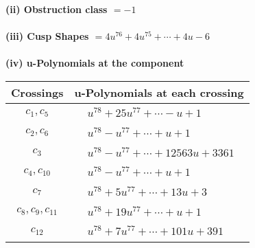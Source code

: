 \documentclass[1p]{elsarticle_modified}
\theoremstyle{definition}
\begin{document}
\flushleft \textbf{(ii) Obstruction class $= -1$}\\~\\
\flushleft \textbf{(iii) Cusp Shapes $= 4 u^{76}+4 u^{75}+\cdots+4 u-6$}\\~\\
\newpage\renewcommand{\arraystretch}{1}
\flushleft \textbf{(iv) u-Polynomials at the component}\newline \\
\begin{tabular}{m{50pt}|m{274pt}}
Crossings & \hspace{64pt}u-Polynomials at each crossing \\
\hline $$\begin{aligned}c_{1},c_{5}\end{aligned}$$&$\begin{aligned}
&u^{78}+25 u^{77}+\cdots- u+1
\end{aligned}$\\
\hline $$\begin{aligned}c_{2},c_{6}\end{aligned}$$&$\begin{aligned}
&u^{78}- u^{77}+\cdots+u+1
\end{aligned}$\\
\hline $$\begin{aligned}c_{3}\end{aligned}$$&$\begin{aligned}
&u^{78}- u^{77}+\cdots+12563 u+3361
\end{aligned}$\\
\hline $$\begin{aligned}c_{4},c_{10}\end{aligned}$$&$\begin{aligned}
&u^{78}- u^{77}+\cdots+u+1
\end{aligned}$\\
\hline $$\begin{aligned}c_{7}\end{aligned}$$&$\begin{aligned}
&u^{78}+5 u^{77}+\cdots+13 u+3
\end{aligned}$\\
\hline $$\begin{aligned}c_{8},c_{9},c_{11}\end{aligned}$$&$\begin{aligned}
&u^{78}+19 u^{77}+\cdots+u+1
\end{aligned}$\\
\hline $$\begin{aligned}c_{12}\end{aligned}$$&$\begin{aligned}
&u^{78}+7 u^{77}+\cdots+101 u+391
\end{aligned}$\\
\hline
\end{tabular}\\~\\
\end{document}
